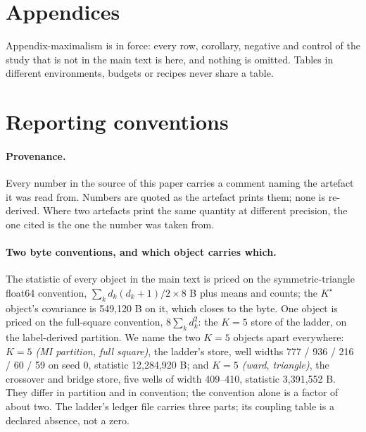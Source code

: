 \documentclass{article} %
\newcommand{\Kstar}{\ensuremath{K^{\star}}}
\begin{document}

\clearpage
\appendix
\section*{Appendices}
Appendix-maximalism is in force: every row, corollary, negative and control of the study that
is not in the main text is here, and nothing is omitted. Tables in different environments,
budgets or recipes never share a table.

\section{Reporting conventions}
\label{app:conventions}

\paragraph{Provenance.} Every number in the source of this paper carries a comment naming the
artefact it was read from. Numbers are quoted as the artefact prints them; none is re-derived.
Where two artefacts print the same quantity at different precision, the one cited is the one the
number was taken from.

\paragraph{Two byte conventions, and which object carries which.} The statistic of every object
in the main text is priced on the symmetric-triangle float64 convention,
$\sum_k d_k(d_k+1)/2\times8$ B plus means and counts; the $\Kstar$ object's covariance is
549,120 B on it, which closes to the byte. %
One object is priced on the full-square convention, $8\sum_k d_k^2$: the $K=5$ store of the
ladder, on the label-derived partition. We name the two $K=5$ objects apart everywhere:
\emph{$K=5$ (MI partition, full square)}, the ladder's store, well widths 777 / 936 / 216 / 60 /
59 on seed 0, statistic 12,284,920 B; and \emph{$K=5$ (ward, triangle)}, the crossover and
bridge store, five wells of width 409--410, statistic 3,391,552 B. They differ in partition and
in convention; the convention alone is a factor of about two.
The ladder's ledger file carries three parts; its coupling table is a declared absence, not a
zero. %
\end{document}
